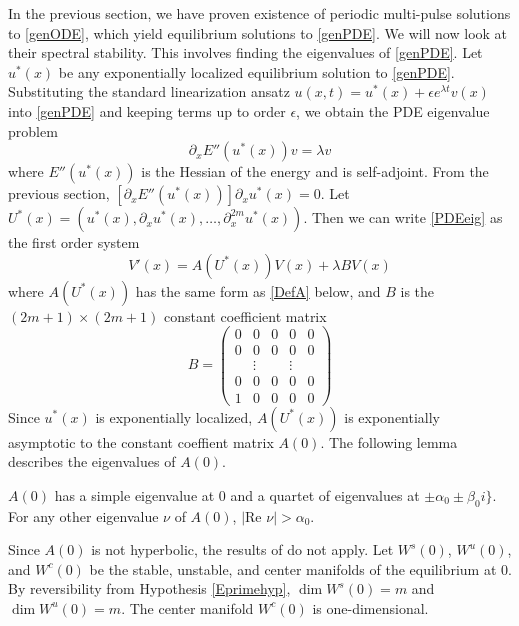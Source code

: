 \documentclass[thesis.tex]{subfiles}
\begin{document}
In the previous section, we have proven existence of periodic multi-pulse solutions to \eqref{genODE}, which yield equilibrium solutions to \eqref{genPDE}. We will now look at their spectral stability. This involves finding the eigenvalues of \eqref{genPDE}. Let $u^*(x)$ be any exponentially localized equilibrium solution to \eqref{genPDE}. Substituting the standard linearization ansatz $u(x, t) = u^*(x) + \epsilon e^{\lambda t}v(x)$ into \eqref{genPDE} and keeping terms up to order $\epsilon$, we obtain the PDE eigenvalue problem
\begin{equation}\label{PDEeig}
\partial_x E''(u^*(x)) v = \lambda v
\end{equation}
where $E''(u^*(x))$ is the Hessian of the energy and is self-adjoint. From the previous section, $[\partial_x E''(u^*(x))] \partial_x u^*(x) = 0$. Let $U^*(x) = (u^*(x), \partial_x u^*(x), \dots, \partial_x^{2m}u^*(x))$. Then we can write \eqref{PDEeig} as the first order system 
\begin{equation}\label{PDEeig2}
V'(x) = A(U^*(x))V(x) + \lambda B V(x)
\end{equation}
where $A(U^*(x))$ has the same form as \eqref{DefA} below, and $B$ is the $(2m+1) \times (2m+1)$ constant coefficient matrix
\begin{equation}\label{DefB}
B = \begin{pmatrix}0 & 0 & 0 & 0 & 0 \\0 & 0 & 0 & 0 & 0 \\  & 
\vdots & & \vdots & \\0 & 0 & 0 & 0 & 0 \\1 & 0 & 0 & 0 & 0 \end{pmatrix} 
\end{equation}
Since $u^*(x)$ is exponentially localized, $A(U^*(x))$ is exponentially asymptotic to the constant coeffient matrix $A(0)$. The following lemma describes the eigenvalues of $A(0)$.

\begin{lemma}\label{eigA0lemma}
$A(0)$ has a simple eigenvalue at 0 and a quartet of eigenvalues at $\pm \alpha_0 \pm \beta_0 i\}$. For any other eigenvalue $\nu$ of $A(0)$, $|\text{Re }\nu| > \alpha_0$. 
\end{lemma}

Since $A(0)$ is not hyperbolic, the results of \cite{Sandstede1998} do not apply. Let $W^s(0)$, $W^u(0)$, and $W^c(0)$ be the stable, unstable, and center manifolds of the equilibrium at 0. By reversibility from Hypothesis \ref{Eprimehyp}, $\dim W^s(0) = m$ and $\dim W^u(0) = m$. The center manifold $W^c(0)$ is one-dimensional.
\end{document}
